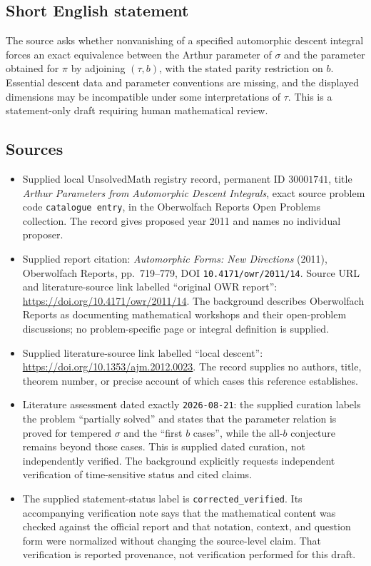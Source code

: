 \documentclass[11pt]{article}
\begin{document}
\subsection{Short English statement}
The source asks whether nonvanishing of a specified automorphic descent integral forces an exact equivalence between the Arthur parameter of \(\sigma\) and the parameter obtained for \(\pi\) by adjoining \((\tau,b)\), with the stated parity restriction on \(b\). Essential descent data and parameter conventions are missing, and the displayed dimensions may be incompatible under some interpretations of \(\tau\). This is a statement-only draft requiring human mathematical review.
\subsection{Sources}
\begin{itemize}
\item Supplied local UnsolvedMath registry record, permanent ID \(30001741\), title \emph{Arthur Parameters from Automorphic Descent Integrals}, exact source problem code \texttt{catalogue entry}, in the Oberwolfach Reports Open Problems collection. The record gives proposed year 2011 and names no individual proposer.
\item Supplied report citation: \emph{Automorphic Forms: New Directions} (2011), Oberwolfach Reports, pp.\ 719--779, DOI \texttt{10.4171/owr/2011/14}. Source URL and literature-source link labelled ``original OWR report'': \url{https://doi.org/10.4171/owr/2011/14}. The background describes Oberwolfach Reports as documenting mathematical workshops and their open-problem discussions; no problem-specific page or integral definition is supplied.
\item Supplied literature-source link labelled ``local descent'': \url{https://doi.org/10.1353/ajm.2012.0023}. The record supplies no authors, title, theorem number, or precise account of which cases this reference establishes.
\item Literature assessment dated exactly \texttt{2026-08-21}: the supplied curation labels the problem ``partially solved'' and states that the parameter relation is proved for tempered \(\sigma\) and the ``first \(b\) cases'', while the all-\(b\) conjecture remains beyond those cases. This is supplied dated curation, not independently verified. The background explicitly requests independent verification of time-sensitive status and cited claims.
\item The supplied statement-status label is \texttt{corrected\_verified}. Its accompanying verification note says that the mathematical content was checked against the official report and that notation, context, and question form were normalized without changing the source-level claim. That verification is reported provenance, not verification performed for this draft.
\end{itemize}
\end{document}
